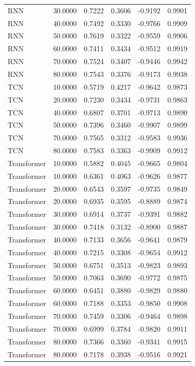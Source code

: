 \begin{tabular}{lrrrrr}
RNN & 30.0000 & 0.7222 & 0.3606 & -0.9192 & 0.9901 \\
RNN & 40.0000 & 0.7492 & 0.3330 & -0.9766 & 0.9909 \\
RNN & 50.0000 & 0.7619 & 0.3322 & -0.9559 & 0.9906 \\
RNN & 60.0000 & 0.7411 & 0.3434 & -0.9512 & 0.9919 \\
RNN & 70.0000 & 0.7524 & 0.3407 & -0.9446 & 0.9942 \\
RNN & 80.0000 & 0.7543 & 0.3376 & -0.9173 & 0.9938 \\
TCN & 10.0000 & 0.5719 & 0.4217 & -0.9642 & 0.9873 \\
TCN & 20.0000 & 0.7230 & 0.3434 & -0.9731 & 0.9863 \\
TCN & 40.0000 & 0.6807 & 0.3701 & -0.9713 & 0.9890 \\
TCN & 50.0000 & 0.7396 & 0.3460 & -0.9907 & 0.9899 \\
TCN & 70.0000 & 0.7565 & 0.3312 & -0.9583 & 0.9936 \\
TCN & 80.0000 & 0.7583 & 0.3363 & -0.9909 & 0.9912 \\
Transformer & 10.0000 & 0.5882 & 0.4045 & -0.9665 & 0.9804 \\
Transformer & 10.0000 & 0.6361 & 0.4063 & -0.9626 & 0.9877 \\
Transformer & 20.0000 & 0.6543 & 0.3597 & -0.9735 & 0.9849 \\
Transformer & 20.0000 & 0.6935 & 0.3595 & -0.8889 & 0.9874 \\
Transformer & 30.0000 & 0.6914 & 0.3737 & -0.9391 & 0.9882 \\
Transformer & 30.0000 & 0.7418 & 0.3132 & -0.8900 & 0.9887 \\
Transformer & 40.0000 & 0.7133 & 0.3656 & -0.9641 & 0.9879 \\
Transformer & 40.0000 & 0.7215 & 0.3308 & -0.9654 & 0.9912 \\
Transformer & 50.0000 & 0.6751 & 0.3513 & -0.9823 & 0.9893 \\
Transformer & 50.0000 & 0.7063 & 0.3690 & -0.9772 & 0.9875 \\
Transformer & 60.0000 & 0.6451 & 0.3880 & -0.9829 & 0.9880 \\
Transformer & 60.0000 & 0.7188 & 0.3353 & -0.9850 & 0.9908 \\
Transformer & 70.0000 & 0.7459 & 0.3306 & -0.9464 & 0.9898 \\
Transformer & 70.0000 & 0.6999 & 0.3784 & -0.9820 & 0.9911 \\
Transformer & 80.0000 & 0.7366 & 0.3360 & -0.9341 & 0.9915 \\
Transformer & 80.0000 & 0.7178 & 0.3938 & -0.9516 & 0.9921 \\
\bottomrule
\end{tabular}
